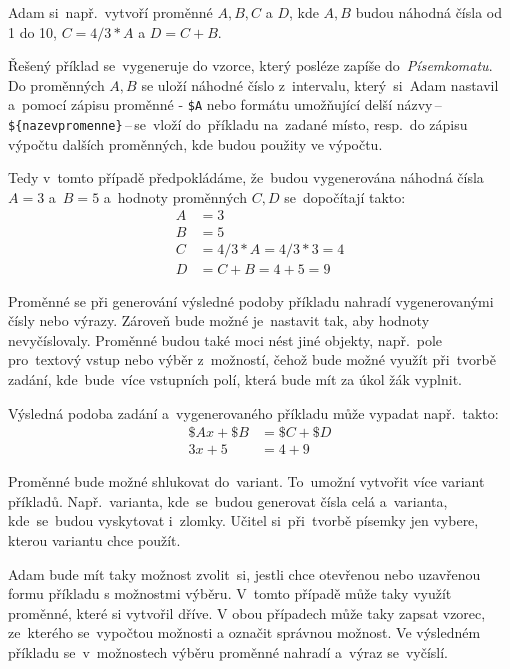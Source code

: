 \documentclass[14pt]{article}
\begin{document}
        Adam si~např.~vytvoří proměnné $A, B, C$ a $D$, kde $A, B$ budou náhodná čísla od 1 do 10, $C = 4/3*A$ a $D = C + B$.

        Řešený příklad se~vygeneruje do vzorce, který posléze zapíše do~\emph{Písemkomatu}. Do proměnných $A, B$ se uloží náhodné číslo
        z~intervalu, který~si~Adam nastavil a~pomocí zápisu proměnné - \texttt{\$A} nebo formátu umožňující
        delší názvy\,--\,\texttt{\$\{nazevpromenne\}}\,--\,se~vloží do~příkladu na~zadané místo, resp.~do zápisu výpočtu dalších proměnných,
        kde budou použity ve výpočtu.
        
        Tedy v~tomto případě předpokládáme, že~budou vygenerována náhodná čísla $A = 3$ a~$B = 5$
        a~hodnoty proměnných $C, D$ se~dopočítají takto:
        \begin{align*}
            A &= 3 \\
            B &= 5 \\
            C &= 4/3*A = 4/3*3 = 4 \\
            D &= C + B = 4 + 5 = 9
        \end{align*}

        Proměnné se při generování výsledné podoby příkladu nahradí vygenerovanými čísly nebo výrazy.
        Zároveň bude možné je~nastavit tak, aby hodnoty nevyčíslovaly. Proměnné budou také moci nést jiné objekty, např.~pole pro~textový vstup
        nebo výběr z~možností, čehož bude možné využít při~tvorbě zadání, kde~bude~více vstupních polí, která bude mít za úkol žák vyplnit.

        Výsledná podoba zadání a~vygenerovaného příkladu může vypadat např.~takto:
        \begin{align*}
            \$Ax + \$B &= \$C + \$D \\
            3x + 5 &= 4 + 9
        \end{align*}

        Proměnné bude možné shlukovat do~variant. To~umožní vytvořit více variant příkladů. Např.~varianta, kde~se~budou generovat čísla celá a~varianta, kde~se~budou vyskytovat i~zlomky.
        Učitel si~při~tvorbě písemky jen vybere, kterou variantu chce použít.

        Adam bude mít taky možnost zvolit~si, jestli chce otevřenou nebo uzavřenou formu příkladu s možnostmi výběru.
        V~tomto případě může taky využít proměnné, které si vytvořil dříve. V obou případech může taky zapsat vzorec,
        ze~kterého se~vypočtou možnosti a označit správnou možnost.
        Ve výsledném příkladu se~v~možnostech výběru proměnné nahradí a~výraz se~vyčíslí.
\end{document}
